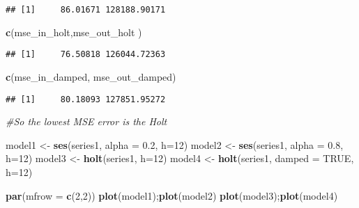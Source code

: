 \documentclass[
]{article}
\newenvironment{Shaded}{\begin{snugshade}}{\end{snugshade}}
\newcommand{\CommentTok}[1]{\textcolor[rgb]{0.56,0.35,0.01}{\textit{#1}}}
\newcommand{\DataTypeTok}[1]{\textcolor[rgb]{0.13,0.29,0.53}{#1}}
\newcommand{\DecValTok}[1]{\textcolor[rgb]{0.00,0.00,0.81}{#1}}
\newcommand{\FloatTok}[1]{\textcolor[rgb]{0.00,0.00,0.81}{#1}}
\newcommand{\KeywordTok}[1]{\textcolor[rgb]{0.13,0.29,0.53}{\textbf{#1}}}
\newcommand{\NormalTok}[1]{#1}
\newcommand{\OtherTok}[1]{\textcolor[rgb]{0.56,0.35,0.01}{#1}}
\newcommand{\StringTok}[1]{\textcolor[rgb]{0.31,0.60,0.02}{#1}}
\begin{document}
\begin{verbatim}
## [1]     86.01671 128188.90171
\end{verbatim}

\begin{Shaded}
\begin{Highlighting}[]
\KeywordTok{c}\NormalTok{(mse_in_holt,mse_out_holt )}
\end{Highlighting}
\end{Shaded}

\begin{verbatim}
## [1]     76.50818 126044.72363
\end{verbatim}

\begin{Shaded}
\begin{Highlighting}[]
\KeywordTok{c}\NormalTok{(mse_in_damped, mse_out_damped)}
\end{Highlighting}
\end{Shaded}

\begin{verbatim}
## [1]     80.18093 127851.95272
\end{verbatim}

\begin{Shaded}
\begin{Highlighting}[]
\CommentTok{#So the lowest MSE error is the Holt}

\NormalTok{model1 <-}\StringTok{ }\KeywordTok{ses}\NormalTok{(series1, }\DataTypeTok{alpha =} \FloatTok{0.2}\NormalTok{, }\DataTypeTok{h=}\DecValTok{12}\NormalTok{)}
\NormalTok{model2 <-}\StringTok{ }\KeywordTok{ses}\NormalTok{(series1, }\DataTypeTok{alpha =} \FloatTok{0.8}\NormalTok{, }\DataTypeTok{h=}\DecValTok{12}\NormalTok{)}
\NormalTok{model3 <-}\StringTok{ }\KeywordTok{holt}\NormalTok{(series1, }\DataTypeTok{h=}\DecValTok{12}\NormalTok{)}
\NormalTok{model4 <-}\StringTok{ }\KeywordTok{holt}\NormalTok{(series1, }\DataTypeTok{damped =} \OtherTok{TRUE}\NormalTok{, }\DataTypeTok{h=}\DecValTok{12}\NormalTok{)}
\end{Highlighting}
\end{Shaded}

\begin{Shaded}
\begin{Highlighting}[]
\KeywordTok{par}\NormalTok{(}\DataTypeTok{mfrow =} \KeywordTok{c}\NormalTok{(}\DecValTok{2}\NormalTok{,}\DecValTok{2}\NormalTok{))}
\KeywordTok{plot}\NormalTok{(model1);}\KeywordTok{plot}\NormalTok{(model2)}
\KeywordTok{plot}\NormalTok{(model3);}\KeywordTok{plot}\NormalTok{(model4)}
\end{Highlighting}
\end{Shaded}
\end{document}
